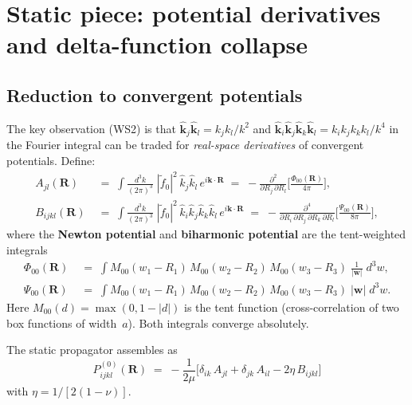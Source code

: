 \documentclass[11pt,a4paper]{article}
\newcommand{\bR}{\bm{R}}
\newcommand{\bk}{\bm{k}}
\newcommand{\bw}{\bm{w}}
\newcommand{\kh}{\hat{\bm{k}}}
\theoremstyle{plain}
\theoremstyle{remark}
\begin{document}
\section{Static piece: potential derivatives and delta-function collapse}
\label{sec:static}

\subsection{Reduction to convergent potentials}

The key observation (WS2) is that $\kh_j\kh_l = k_j k_l / k^2$
and $\kh_i\kh_j\kh_k\kh_l = k_i k_j k_k k_l / k^4$ in the
Fourier integral can be traded for
\emph{real-space derivatives} of convergent potentials.  Define:
\begin{align}
  A_{jl}(\bR) &\;=\;
    \int\!\frac{d^3k}{(2\pi)^3}\;
    |\tilde{f}_0|^2\,\hat{k}_j\hat{k}_l\,e^{i\bk\cdot\bR}
  \;=\; -\frac{\partial^2}{\partial R_j\,\partial R_l}
  \biggl[\frac{\Phi_{00}(\bR)}{4\pi}\biggr],
  \label{eq:Ajl}
  \\[4pt]
  B_{ijkl}(\bR) &\;=\;
    \int\!\frac{d^3k}{(2\pi)^3}\;
    |\tilde{f}_0|^2\,\hat{k}_i\hat{k}_j\hat{k}_k\hat{k}_l\,
    e^{i\bk\cdot\bR}
  \;=\; -\frac{\partial^4}{\partial R_i\,\partial R_j\,
    \partial R_k\,\partial R_l}
  \biggl[\frac{\Psi_{00}(\bR)}{8\pi}\biggr],
  \label{eq:Bijkl}
\end{align}
where the \textbf{Newton potential} and \textbf{biharmonic potential}
are the tent-weighted integrals
\begin{align}
  \Phi_{00}(\bR) &\;=\;
  \int M_{00}(w_1-R_1)\,M_{00}(w_2-R_2)\,M_{00}(w_3-R_3)\;
  \frac{1}{|\bw|}\;d^3w,
  \label{eq:Phi00}
  \\[2pt]
  \Psi_{00}(\bR) &\;=\;
  \int M_{00}(w_1-R_1)\,M_{00}(w_2-R_2)\,M_{00}(w_3-R_3)\;
  |\bw|\;d^3w.
  \label{eq:Psi00}
\end{align}
Here $M_{00}(d) = \max(0, 1-|d|)$ is the tent function (cross-correlation
of two box functions of width~$a$).  Both integrals converge absolutely.

The static propagator assembles as
\begin{equation}
  \boxed{
  P^{(0)}_{ijkl}(\bR) \;=\;
  -\frac{1}{2\mu}\bigl[
    \delta_{ik}\,A_{jl}
  + \delta_{jk}\,A_{il}
  - 2\eta\,B_{ijkl}
  \bigr]
  }
  \label{eq:Pstatic}
\end{equation}
with $\eta = 1/[2(1-\nu)]$.
\end{document}

